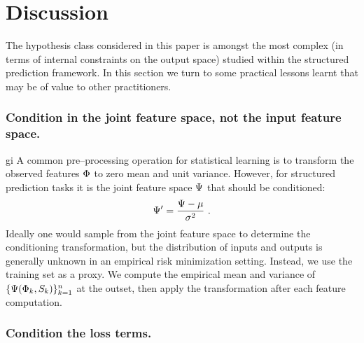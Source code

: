 \section{Discussion}
\label{sec:discussion}

The hypothesis class considered in this paper is amongst the most
complex (in terms of internal constraints on the output space) studied
within the structured prediction framework. In this section we turn to
some practical lessons learnt that may be of value to other
practitioners.

\subsubsection{Condition in the joint feature space, not the input
  feature space.}
gi
A common pre--processing operation for statistical learning is to
transform the observed features $\Features$ to zero mean and unit
variance. However, for structured prediction tasks it is the joint
feature space $\JointFtr$ that should be conditioned:
\begin{equation}
  \label{eq:conditioning}
  \JointFtr' = \frac{\JointFtr - \mu}{\sigma^2} ~.
\end{equation}
Ideally one would sample from the joint feature space to determine the
conditioning transformation, but the distribution of inputs and
outputs is generally unknown in an empirical risk minimization
setting. Instead, we use the training set as a proxy. We compute the
empirical mean and variance of
$\{\JointFtr(\Features_k,\Seam_k)\}_{k=1}^n$ at the outset, then apply
the transformation  after each feature
computation.

\subsubsection{Condition the loss terms.}

